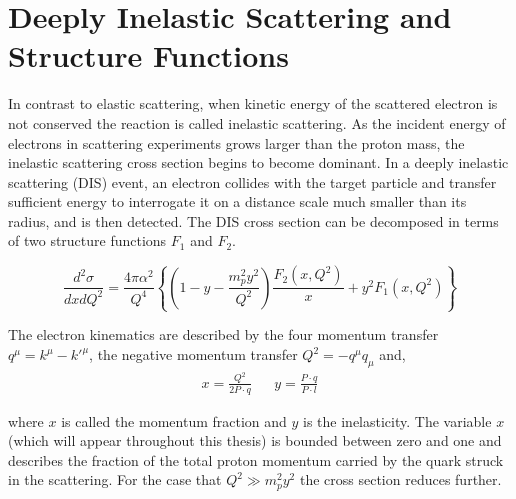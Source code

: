\section{Deeply Inelastic Scattering and Structure Functions}

In contrast to elastic scattering, when kinetic energy of the scattered electron is not conserved the reaction is called inelastic scattering.  As the incident energy of electrons in scattering experiments grows larger than the proton mass, the inelastic scattering cross section begins to become dominant.  In a deeply inelastic scattering (DIS) event, an electron collides with the target particle and transfer sufficient energy to interrogate it on a distance scale much smaller than its radius, and is then detected.  The DIS cross section can be decomposed in terms of two structure functions $F_1$ and $F_2$.  

\begin{equation}
	\label{eqn:sfs}
	\frac{d^2\sigma}{dx dQ^2} = \frac{4 \pi \alpha^2}{Q^4} \left\lbrace \left( 1 - y - \frac{m_p^2 y^2}{Q^2} \right) \frac{F_2(x,Q^2)}{x} + y^2 F_1 (x,Q^2) \right\rbrace
\end{equation}

The electron kinematics are described by the four momentum transfer $q^{\mu} = k^{\mu} - k'^{\mu}$, the negative momentum transfer $Q^2 = - q^{\mu} q_{\mu}$ and,
\begin{align}  
  x = \frac{Q^{2}}{2P \cdot q} && y = \frac{P \cdot q}{P \cdot l} 
\end{align}

where $x$ is called the momentum fraction and $y$ is the inelasticity.  The variable $x$ (which will appear throughout this thesis) is bounded between zero and one and describes the fraction of the total proton momentum carried by the quark struck in the scattering.  For the case that $Q^2 \gg m_p^2 y^2$ the cross section reduces further.

